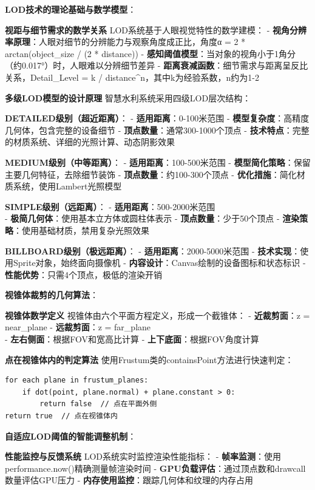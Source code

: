 \textbf{LOD技术的理论基础与数学模型}：

\textbf{视距与细节需求的数学关系} LOD系统基于人眼视觉特性的数学建模： - \textbf{视角分辨率原理}：人眼对细节的分辨能力与观察角度成正比，角度α = 2 * arctan(object\_size / (2 * distance)) - \textbf{感知阈值模型}：当对象的视角小于1角分（约0.017°）时，人眼难以分辨细节差异 - \textbf{距离衰减函数}：细节需求与距离呈反比关系，Detail\_Level = k / distance\^{}n，其中k为经验系数，n约为1-2

\textbf{多级LOD模型的设计原理} 智慧水利系统采用四级LOD层次结构：

\textbf{DETAILED级别（超近距离）}： - \textbf{适用距离}：0-100米范围 - \textbf{模型复杂度}：高精度几何体，包含完整的设备细节 - \textbf{顶点数量}：通常300-1000个顶点 - \textbf{技术特点}：完整的材质系统、详细的光照计算、动态阴影效果

\textbf{MEDIUM级别（中等距离）}： - \textbf{适用距离}：100-500米范围 - \textbf{模型简化策略}：保留主要几何特征，去除细节装饰 - \textbf{顶点数量}：约100-300个顶点 - \textbf{优化措施}：简化材质系统，使用Lambert光照模型

\textbf{SIMPLE级别（远距离）}： - \textbf{适用距离}：500-2000米范围\\
- \textbf{极简几何体}：使用基本立方体或圆柱体表示 - \textbf{顶点数量}：少于50个顶点 - \textbf{渲染策略}：使用基础材质，禁用复杂光照效果

\textbf{BILLBOARD级别（极远距离）}： - \textbf{适用距离}：2000-5000米范围 - \textbf{技术实现}：使用Sprite对象，始终面向摄像机 - \textbf{内容设计}：Canvas绘制的设备图标和状态标识 - \textbf{性能优势}：只需4个顶点，极低的渲染开销

\textbf{视锥体裁剪的几何算法}：

\textbf{视锥体数学定义} 视锥体由六个平面方程定义，形成一个截锥体： - \textbf{近裁剪面}：z = near\_plane - \textbf{远裁剪面}：z = far\_plane\\
- \textbf{左右侧面}：根据FOV和宽高比计算 - \textbf{上下底面}：根据FOV角度计算

\textbf{点在视锥体内的判定算法} 使用Frustum类的containsPoint方法进行快速判定：

\begin{lstlisting}
for each plane in frustum_planes:
    if dot(point, plane.normal) + plane.constant > 0:
        return false  // 点在平面外侧
return true  // 点在视锥体内
\end{lstlisting}

\textbf{自适应LOD阈值的智能调整机制}：

\textbf{性能监控与反馈系统} LOD系统实时监控渲染性能指标： - \textbf{帧率监测}：使用performance.now()精确测量帧渲染时间 - \textbf{GPU负载评估}：通过顶点数和drawcall数量评估GPU压力 - \textbf{内存使用监控}：跟踪几何体和纹理的内存占用

